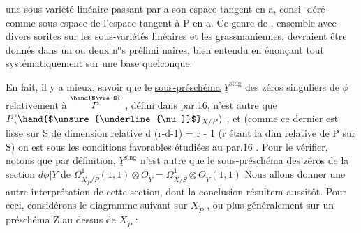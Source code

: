 
une sous-variété linéaire passant par a son espace tangent en a, consi-%
déré comme sous-espace  de l'espace tangent à P en a. Ce genre
\margin{\hand{|}}de , ensemble avec divers sorites sur les sous-variétés linéaires
et les grassmaniennes, devraient être donnés dans un ou deux n$^{\text{o}}$s prélimi
naires, bien entendu en énonçant tout systématiquement sur une base
quelconque.

En fait, il y a mieux, savoir que le \uline{sous-préschéma} $\underline{Y}^{\mathrm{sing}}$
des zéros singuliers de $\phi$ relativement à $\overset{\hand{$\vee$}}{P}$ , défini dans par.16, n'est
autre que $P(\hand{$\unsure{\underline{\nu}}$}_{X/P})$ , et (comme ce dernier est lisse sur S de dimension
relative d \unsure{$+$} (r-d-1) = r - 1 (r étant la dim relative de P sur S)
on est sous les conditions favorables étudiées au par.16 .  Pour le vérifier,
notons que par définition, $\underline{Y}^{\mathrm{sing}}$ n'est autre que le sous-préschéma 
des zéros de la section \inserted{$\psi =$} $d\phi|\underline{Y}$ de $\underline{\Omega}^1_{X_{\check{P}}/\check{P}}(1,1)\otimes \underline{O}_Y = \underline{\Omega}^1_{X/S}\otimes\underline{O}_Y(1,1)$
Nous allons donner une autre interprétation de cette section, dont
la conclusion résultera aussitôt. Pour ceci, considérons le diagramme
 
suivant sur $X_{\check{P}}$ , ou plus généralement sur un préschéma Z  au dessus de
$X_{\check{P}}$ :

